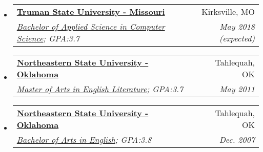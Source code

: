 \documentclass[letterpaper,11pt]{article}
\makeatletter
\newcommand{\resitem}[1]{\item #1 \vspace{-2pt}}
\newcommand{\ressubheading}[4]{
\begin{tabular*}{6.5in}{l@{\extracolsep{\fill}}r}
		\textbf{#1} & #2 \\
		\textit{#3} & \textit{#4} \\
\end{tabular*}\vspace{-6pt}}
\makeatother
\begin{document}
	\begin{itemize}
		\item
			\ressubheading {\href{http://www.truman.edu}{Truman State University - Missouri}}{Kirksville, MO}{\href{http://www.truman.edu/majors-programs/majors-minors/computer-science-major/}{Bachelor of Applied Science in Computer Science};  {GPA:3.7}}{May 2018 (expected)}
		\item	
			\ressubheading{\href{http://www.nsuok.edu}{Northeastern State University - Oklahoma}}{Tahlequah, OK}{\href{https://www.nsuok.edu/Academics/DegreesMajors/GraduateMasters.aspx}{Master of Arts in English Literature}; {GPA:3.7}}{May 2011}
		\item	
			\ressubheading{\href{http://www.nsuok.edu}{Northeastern State University - Oklahoma}}{Tahlequah, OK}{\href{https://www.nsuok.edu/Academics/DegreesMajors/Tahlequah.aspx}{Bachelor of Arts in English}; {GPA:3.8}}{Dec. 2007}
	\end{itemize} %
\end{document}
